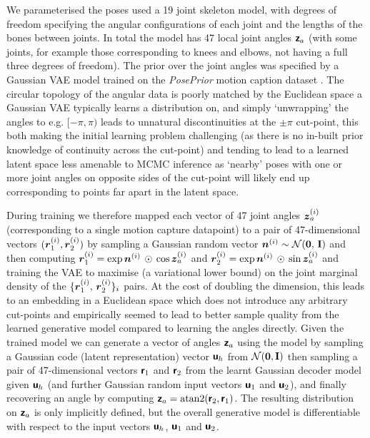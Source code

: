 We parameterised the poses used a 19 joint skeleton model, with degrees of freedom specifying the angular configurations of each joint and the lengths of the bones between joints. In total the model has 47 local joint angles $\boldsymbol{\mathsf{z}}_a$ (with some joints, for example those corresponding to knees and elbows, not having a full three degrees of freedom). The prior over the joint angles was specified by a Gaussian \ac{VAE} model trained on the \emph{PosePrior} motion caption dataset \citep{akhter2015pose}. The circular topology of the angular data is poorly matched by the Euclidean space a Gaussian \ac{VAE} typically learns a distribution on, and simply `unwrapping' the angles to e.g. $[-\pi,\pi)$ leads to unnatural discontinuities at the $\pm \pi$ cut-point, this both making the initial learning problem challenging (as there is no in-built prior knowledge of continuity across the cut-point) and tending to lead to a learned latent space less amenable to \ac{MCMC} inference as `nearby' poses with one or more joint angles on opposite sides of the cut-point will likely end up corresponding to points far apart in the latent space.

During training we therefore mapped each vector of 47 joint angles $\boldsymbol{z}_a^{(i)}$ (corresponding to a single motion capture datapoint) to a pair of 47-dimensional vectors $(\boldsymbol{r}_1^{(i)},\boldsymbol{r}_2^{(i)})$ by sampling a Gaussian random vector $\vct{n}^{(i)} \sim \nrm{\vct{0},\,\idmtx}$ and then computing $\boldsymbol{r}_1^{(i)} = \exp\boldsymbol{n}^{(i)}\,\odot\,\cos\boldsymbol{z}_a^{(i)}$ and $ \boldsymbol{r}^{(i)}_2 = \exp\boldsymbol{n}^{(i)}\,\odot\,\sin\boldsymbol{z}^{(i)}_a$ and training the \ac{VAE} to maximise (a variational lower bound) on the joint marginal density of the $\lbrace \boldsymbol{r}^{(i)}_1,\,\boldsymbol{r}^{(i)}_2\rbrace_i$ pairs. At the cost of doubling the dimension, this leads to an embedding in a Euclidean space which does not introduce any arbitrary cut-points and empirically seemed to lead to better sample quality from the learned generative model compared to learning the angles directly. Given the trained model we can generate a vector of angles $\boldsymbol{\mathsf{z}}_a$ using the model by sampling a Gaussian code (latent representation) vector $\boldsymbol{\mathsf{u}}_h$ from $\nrm{\vct{0},\idmtx}$ then sampling a pair of 47-dimensional vectors $\boldsymbol{\mathsf{r}}_1$ and $\boldsymbol{\mathsf{r}}_2$ from the learnt Gaussian decoder model given $\boldsymbol{\mathsf{u}}_h$ (and further Gaussian random input vectors $\boldsymbol{\mathsf{u}}_1$ and $\boldsymbol{\mathsf{u}}_2$), and finally recovering an angle by computing $\boldsymbol{\mathsf{z}}_a = \textrm{atan2}(\boldsymbol{\mathsf{r}}_2,\boldsymbol{\mathsf{r}}_1)$. The resulting distribution on $\boldsymbol{\mathsf{z}}_a$ is only implicitly defined, but the overall generative model is differentiable with respect to the input vectors $\boldsymbol{\mathsf{u}}_h$, $\boldsymbol{\mathsf{u}}_1$ and $\boldsymbol{\mathsf{u}}_2$.

